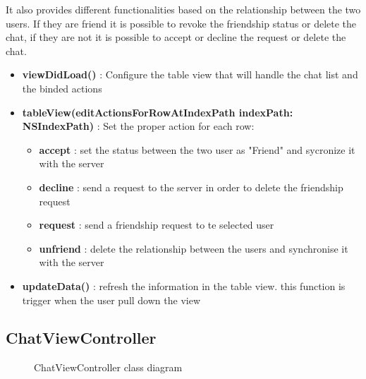 It also provides different functionalities based on the relationship between the two users. If they are friend it is possible to revoke the friendship status or delete the chat, if they are not it is possible to accept or decline the request or delete the chat.

\begin{itemize}

\item \textbf{viewDidLoad()} : Configure the table view that will handle the chat list and the binded actions

\item \textbf{tableView(editActionsForRowAtIndexPath indexPath: NSIndexPath)} : Set the proper action for each row:

\begin{itemize}
\item \textbf{accept} : set the status between the two user as "Friend" and sycronize it with the server
\item \textbf{decline} : send a request to the server in order to delete the friendship request
\item \textbf{request} : send a friendship request to te selected user
\item \textbf{unfriend} : delete the relationship between the users and synchronise it with the server

\end{itemize}

\item \textbf{updateData()} : refresh the information in the table view. this function is trigger when the user pull down the view

\end{itemize}

\newpage
\subsection{ChatViewController} 


\begin{figure}[H]
\caption{ChatViewController class diagram}
\end{figure}

